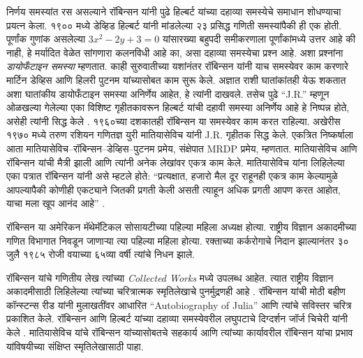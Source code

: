 \documentclass[../../../include/open-logic-section]{subfiles}
\begin{document}
निर्णय समस्यांत रस असल्याने रॉबिन्सन यांनी पुढे हिल्बर्ट यांच्या दहाव्या समस्येचे समाधान शोधण्याचा प्रयत्न केला. १९०० मध्ये डेव्हिड हिल्बर्ट यांनी मांडलेल्या २३ प्रसिद्ध गणिती समस्यांपैकी ही एक होती. पूर्णांक गुणांक असलेल्या $3x^2 - 2y +3 = 0$ यांसारख्या बहुपदी समीकरणाला पूर्णांकांमध्ये उत्तर आहे की नाही, हे मर्यादित वेळेत सांगणारा कलनविधी आहे का, असा दहाव्या समस्येचा प्रश्न आहे. अशा प्रश्नांना \emph{डायोफँटाइन समस्या} म्हणतात. काही सुरुवातीच्या यशांनंतर रॉबिन्सन यांनी याच समस्येवर काम करणारे मार्टिन डेव्हिस आणि हिलरी पुटनम यांच्यासोबत काम सुरू केले. अज्ञात राशी घातांकांतही येऊ शकतात अशा घातांकीय डायोफँटाइन समस्या अनिर्णेय आहेत, हे त्यांनी दाखवले. तसेच पुढे “J.R.” म्हणून ओळखल्या गेलेल्या एका विशिष्ट गृहीतकावरून हिल्बर्ट यांची दहावी समस्या अनिर्णेय आहे हे निष्पन्न होते, असेही त्यांनी सिद्ध केले \citep{DavisPutnamRobinson1961}. १९६०च्या दशकातही रॉबिन्सन या समस्येवर काम करत राहिल्या. अखेरीस १९७० मध्ये तरुण रशियन गणितज्ञ युरी मातियासेविच यांनी J.R. गृहीतक सिद्ध केले. एकत्रित निष्कर्षाला आता मातियासेविच–रॉबिन्सन–डेव्हिस–पुटनम प्रमेय, संक्षेपात MRDP प्रमेय, म्हणतात. मातियासेविच आणि रॉबिन्सन यांची मैत्री झाली आणि त्यांनी अनेक लेखांवर एकत्र काम केले. मातियासेविच यांना लिहिलेल्या एका पत्रात रॉबिन्सन यांनी असे म्हटले होते: “प्रत्यक्षात, हजारो मैल दूर राहूनही एकत्र काम केल्यामुळे आपल्यापैकी कोणीही एकट्याने जितकी प्रगती केली असती त्याहून अधिक प्रगती आपण करत आहोत, याचा मला खूप आनंद आहे” \citep[45]{Matijasevich1992}.

रॉबिन्सन या अमेरिकन मॅथेमॅटिकल सोसायटीच्या पहिल्या महिला अध्यक्ष होत्या. राष्ट्रीय विज्ञान अकादमीच्या गणित विभागात निवडून जाणाऱ्या त्या पहिल्या महिला होत्या. रक्ताच्या कर्करोगाचे निदान झाल्यानंतर ३० जुलै १९८५ रोजी वयाच्या ६५व्या वर्षी त्यांचे निधन झाले.

\begin{reading}
रॉबिन्सन यांचे गणितीय लेख त्यांच्या \textit{Collected Works} \citep{Robinson1996} मध्ये उपलब्ध आहेत. त्यात राष्ट्रीय विज्ञान अकादमीसाठी लिहिलेल्या त्यांच्या चरित्रात्मक स्मृतिलेखाचे पुनर्मुद्रणही आहे \citep{Feferman1994}. रॉबिन्सन यांची मोठी बहीण कॉन्स्टन्स रीड यांनी मुलाखतींवर आधारित “Autobiography of Julia” \citep{Reid1986} आणि त्यांचे सविस्तर चरित्र \citep{Reid1996} प्रकाशित केले. रॉबिन्सन आणि हिल्बर्ट यांच्या दहाव्या समस्येवरील लघुपटाचे दिग्दर्शन जॉर्ज चिचेरी यांनी केले \citep{Csicsery2016}. मातियासेविच यांचे रॉबिन्सन यांच्यासोबतचे सहकार्य आणि त्यांच्या कार्यावरील रॉबिन्सन यांचा प्रभाव यांविषयीच्या संक्षिप्त स्मृतिलेखासाठी \citep{Matijasevich1992} पाहा.
\end{reading}
\end{document}
